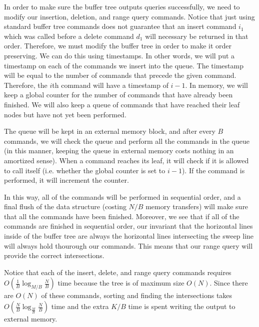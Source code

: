 \documentclass[psamsfonts]{amsart}
\newenvironment{sol}{\vspace{0.25cm}{\large \bfseries Solution:}}{\qedsymbol}
\begin{document}
\begin{sol}
In order to make sure the buffer tree outputs queries successfully, we need to modify our insertion, deletion, and range query commands. Notice that just using standard buffer tree commands does not guarantee that an insert command $i_1$ which was called before a delete command $d_1$ will necessary be returned in that order. Therefore, we must modify the buffer tree in order to make it order preserving. We can do this using timestamps. In other words, we will put a timestamp on each of the commands we insert into the queue. The timestamp will be equal to the number of commands that precede the given command. Therefore, the $i$th command will have a timestamp of $i-1$. In memory, we will keep a global counter for the number of commands that have already been finished. We will also keep a queue of commands that have reached their leaf nodes but have not yet been performed. 

The queue will be kept in an external memory block, and after every $B$ commands, we will check the queue and perform all the commands in the queue (in this manner, keeping the queue in external memory costs nothing in an amortized sense). When a command reaches its leaf, it will check if it is allowed to call itself (i.e. whether the global counter is set to $i-1$). If the command is performed, it will increment the counter. 

In this way, all of the commands will be performed in sequential order, and a final flush of the data structure (costing $N/B$ memory transfers) will make sure that all the commands have been finished. Moreover, we see that if all of the commands are finished in sequential order, our invariant that the horizontal lines inside of the buffer tree are always the horizontal lines intersecting the sweep line will always hold thourough our commands. This means that our range query will provide the correct intersections. 

Notice that each of the insert, delete, and range query commands requires $O(\frac{1}{B} \log_{M/B} \frac{N}{B})$ time because the tree is of maximum size $O(N)$. Since there are $O(N)$ of these commands, sorting and finding the intersections takes $O(\frac{N}{B} \log_{\frac{M}{B}} \frac{N}{B})$ time and the extra $K/B$ time is spent writing the output to external memory.
\end{sol}
\end{document}
